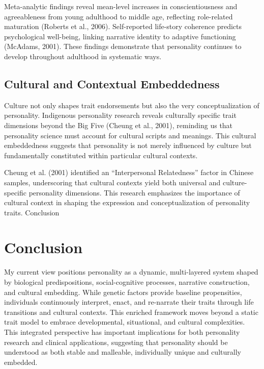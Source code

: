 \documentclass[stu]{apa7}
\begin{document}
Meta-analytic findings reveal mean-level increases in conscientiousness and agreeableness from young adulthood to middle age, reflecting role-related maturation (Roberts et al., 2006). Self-reported life-story coherence predicts psychological well-being, linking narrative identity to adaptive functioning (McAdams, 2001). These findings demonstrate that personality continues to develop throughout adulthood in systematic ways.

\subsection{Cultural and Contextual Embeddedness}

Culture not only shapes trait endorsements but also the very conceptualization of personality. Indigenous personality research reveals culturally specific trait dimensions beyond the Big Five (Cheung et al., 2001), reminding us that personality science must account for cultural scripts and meanings. This cultural embeddedness suggests that personality is not merely influenced by culture but fundamentally constituted within particular cultural contexts.

Cheung et al. (2001) identified an ``Interpersonal Relatedness'' factor in Chinese samples, underscoring that cultural contexts yield both universal and culture-specific personality dimensions. This research emphasizes the importance of cultural context in shaping the expression and conceptualization of personality traits.
Conclusion

\section{Conclusion}

My current view positions personality as a dynamic, multi-layered system shaped by biological predispositions, social-cognitive processes, narrative construction, and cultural embedding. While genetic factors provide baseline propensities, individuals continuously interpret, enact, and re-narrate their traits through life transitions and cultural contexts. This enriched framework moves beyond a static trait model to embrace developmental, situational, and cultural complexities. This integrated perspective has important implications for both personality research and clinical applications, suggesting that personality should be understood as both stable and malleable, individually unique and culturally embedded.
\end{document}
